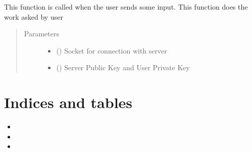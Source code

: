\documentclass[letterpaper,10pt,english]{sphinxmanual}
\begin{document}
\begin{fulllineitems}
\label{\detokenize{userInputHandler:userInputHandler.handleUserInput}}
This function is called when the user sends some input. This function does the work asked by user
\begin{quote}\begin{description}
\item[{Parameters}] \leavevmode\begin{itemize}
\item {} 
 () \textendash{} Socket for connection with server

\item {} 
 () \textendash{} Server Public Key and User Private Key

\end{itemize}

\end{description}\end{quote}

\end{fulllineitems}



\chapter{Indices and tables}
\label{\detokenize{index:indices-and-tables}}\begin{itemize}
\item {} 

\item {} 

\item {} 

\end{itemize}


\renewcommand{\indexname}{Python Module Index}
\begin{sphinxtheindex}
\let\bigletter\sphinxstyleindexlettergroup
\bigletter{a}
\item\relax{}
\indexspace
\bigletter{m}
\item\relax{}
\indexspace
\bigletter{u}
\item\relax{}
\end{sphinxtheindex}

\renewcommand{\indexname}{Index}
\printindex
\end{document}
